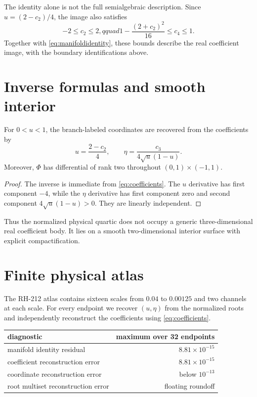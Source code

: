 \documentclass[12pt]{article}
\theoremstyle{remark}\newtheorem{remark}[theorem]{Remark}
\begin{document}
The identity alone is not the full semialgebraic description.  Since
$u=(2-c_2)/4$, the image also satisfies
\begin{equation}\label{eq:inequalities}
 -2\le c_2\le2,qquad
 1-\frac{(2+c_2)^2}{16}\le c_4\le1.
\end{equation}
Together with \eqref{eq:manifoldidentity}, these bounds describe the real
coefficient image, with the boundary identifications above.

\section{Inverse formulas and smooth interior}

\begin{proposition}\label{prop:inverse}
For $0<u<1$, the branch-labeled coordinates are recovered from the
coefficients by
\begin{equation}\label{eq:inverse}
 u=\frac{2-c_2}{4},
 \qquad
 \eta=\frac{c_3}{4\sqrt u(1-u)}.
\end{equation}
Moreover, $\Phi$ has differential of rank two throughout
$(0,1)\times(-1,1)$.
\end{proposition}
\begin{proof}
The inverse is immediate from \eqref{eq:coefficients}.  The $u$ derivative
has first component $-4$, while the $\eta$ derivative has first component
zero and second component $4\sqrt u(1-u)>0$.  They are linearly independent.
\end{proof}

Thus the normalized physical quartic does not occupy a generic
three-dimensional real coefficient body.  It lies on a smooth
two-dimensional interior surface with explicit compactification.

\section{Finite physical atlas}

The RH-212 atlas contains sixteen scales from $0.04$ to $0.00125$ and two
channels at each scale.  For every endpoint we recover $(u,\eta)$ from the
normalized roots and independently reconstruct the coefficients using
\eqref{eq:coefficients}.

\begin{center}
\begin{tabular}{lr}
\toprule
diagnostic & maximum over 32 endpoints\\
\midrule
manifold identity residual & $8.81\times10^{-15}$\\
coefficient reconstruction error & $8.81\times10^{-15}$\\
coordinate reconstruction error & below $10^{-13}$\\
root multiset reconstruction error & floating roundoff\\
\bottomrule
\end{tabular}
\end{center}
\end{document}
